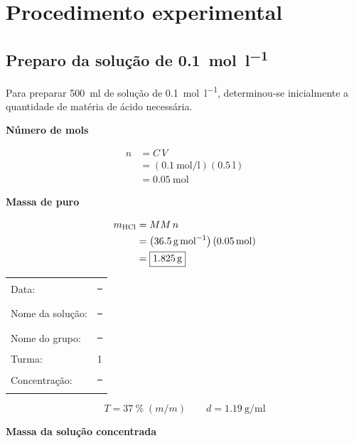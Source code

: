 \documentclass[a4paper,12pt]{article}
\newcommand{\subtitulo}[1]{%
  \par\medskip
  {\color{quadroazul}\bfseries\large #1}\par\smallskip
}
\begin{document}
\section{Procedimento experimental}

\subsection{Preparo da solução de  \qty{0.1}{\mole\per\litre}}

Para preparar \qty{500}{\milli\litre} de solução de 
\qty{0.1}{\mole\per\litre}, determinou-se inicialmente a quantidade de matéria de ácido necessária.

\subtitulo{Número de mols}

\begin{align*}
  n &= C\,V \\
    &= \left(\qty{0.1}{\mole\per\litre}\right)
       \left(\qty{0.5}{\litre}\right) \\
    &= \boxed{\qty{0.05}{\mole}}
\end{align*}

\subtitulo{Massa de  puro}

\begin{align*}
  m_{\ce{HCl}} &= MM\,n \\
    &= \left(\qty{36.5}{\gram\per\mole}\right)
       \left(\qty{0.05}{\mole}\right) \\
    &= \boxed{\qty{1.825}{\gram}}
\end{align*}

\begin{tcolorbox}[
  title=Etiqueta da solução,
  colback=quadrocinza,
  colframe=black!65,
  boxrule=0.6pt,
  arc=1mm
]
\begin{tabular}{@{}ll@{}}
Data: & \rule{4.0cm}{0.4pt}\\[1.3ex]
Nome da solução: & \rule{2.2cm}{0.4pt}\\[1.3ex]
Nome do grupo: & \rule{2.5cm}{0.4pt}\\[1.3ex]
Turma: & 1\\[1.3ex]
Concentração: & \rule{2.8cm}{0.4pt}
\end{tabular}
\end{tcolorbox}

\vspace{0.3cm}

\begin{tcolorbox}[
  title=Dados da solução concentrada de \ce{HCl},
  colback=quadrocinza,
  colframe=black!65,
  boxrule=0.6pt,
  arc=1mm
]
\[
  T = \qty{37}{\percent}\;(m/m)
  \qquad
  d = \qty{1.19}{\gram\per\milli\litre}
\]
\end{tcolorbox}
\newpage
\subtitulo{Massa da solução concentrada}
\end{document}
